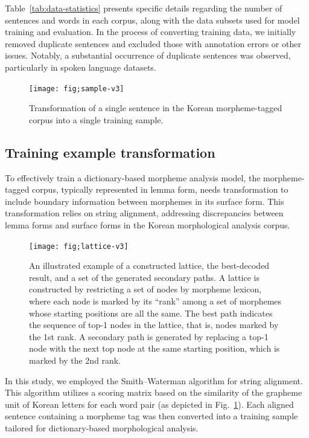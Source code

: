 \documentclass[AMS,STIX2COL]{WileyNJD-v2}
\begin{document}
    Table~\ref{tab:data-statistics} presents specific details regarding the number of sentences and words in each corpus, along with the data subsets used for model training and evaluation.
    In the process of converting training data, we initially removed duplicate sentences and excluded those with annotation errors or other issues.
    Notably, a substantial occurrence of duplicate sentences was observed, particularly in spoken language datasets.

    \begin{figure}[ht]
        \centerline{\texttt{[image: fig;sample-v3]}}
        \caption{Transformation of a single sentence in the Korean morpheme-tagged corpus into a single training sample.}
        \label{fig:sample}
    \end{figure}

    \subsection{Training example transformation}\label{subsec:training-example-transformation}

    To effectively train a dictionary-based morpheme analysis model, the morpheme-tagged corpus, typically represented in lemma form, needs transformation to include boundary information between morphemes in its surface form.
    This transformation relies on string alignment, addressing discrepancies between lemma forms and surface forms in the Korean morphological analysis corpus.

    \begin{figure}[ht]
        \centerline{\texttt{[image: fig;lattice-v3]}}
        \caption{An illustrated example of a constructed lattice, the best-decoded result, and a set of the generated secondary paths. A lattice is constructed by restricting a set of nodes by morpheme lexicon, where each node is marked by its ``rank'' among a set of morphemes whose starting positions are all the same. The best path indicates the sequence of top-1 nodes in the lattice, that is, nodes marked by the 1st rank. A secondary path is generated by replacing a top-1 node with the next top node at the same starting position, which is marked by the 2nd rank.}
        \label{fig:lattice}
    \end{figure}

    In this study, we employed the Smith--Waterman algorithm for string alignment.
    This algorithm utilizes a scoring matrix based on the similarity of the grapheme unit of Korean letters for each word pair (as depicted in Fig.~\ref{fig:sample}).
    Each aligned sentence containing a morpheme tag was then converted into a training sample tailored for dictionary-based morphological analysis.
\end{document}
